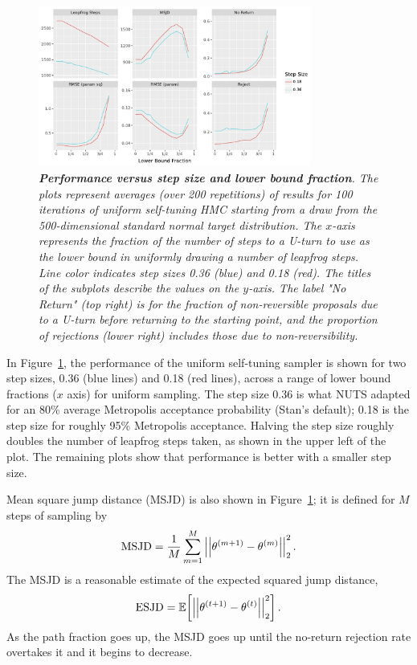 \documentclass[letterpaper,11pt]{article}
\theoremstyle{plain}%
\theoremstyle{remark}
\begin{document}
\begin{figure}[t]
\begin{center}
\includegraphics[width=0.8\textwidth]{img/results/uniform/uniform_prob_steps_plot.pdf}
\end{center}
\caption{\it {\bfseries Performance versus step size and lower bound fraction}.  The plots represent averages (over 200 repetitions) of results for 100 iterations of uniform self-tuning HMC starting from a draw from the 500-dimensional standard normal target distribution.  The $x$-axis represents the fraction of the number of steps to a U-turn to use as the lower bound in uniformly drawing a number of leapfrog steps.  Line color indicates step sizes 0.36 (blue) and 0.18 (red).  The titles of the subplots describe the values on the $y$-axis.  The label "No Return" (top right) is for the fraction of non-reversible proposals due to a U-turn before returning to the starting point, and the proportion of rejections (lower right) includes those due to non-reversibility.}\label{fig:step-lb-uniform}
\end{figure}

In Figure~\ref{fig:step-lb-uniform}, the performance of the uniform self-tuning sampler is shown for two step sizes, 0.36 (blue lines) and 0.18 (red lines), across a range of lower bound fractions ($x$ axis) for uniform sampling.  The step size 0.36 is what NUTS adapted for an 80\% average Metropolis acceptance probability (Stan's default); 0.18 is the step size for roughly 95\% Metropolis acceptance.  Halving the step size roughly doubles the number of leapfrog steps taken, as shown in the upper left of the plot.  The remaining plots show that performance is better with a smaller step size.  

Mean square jump distance (MSJD) is also shown in Figure~\ref{fig:step-lb-uniform}; it is defined for $M$ steps of sampling by
\begin{equation}
\textrm{MSJD}
= \frac{1}{M} \sum_{m = 1}^M \left|\left|\theta^{(m+1)} - \theta^{(m)}\right|\right|_2^2.
\end{equation}
The MSJD is a reasonable estimate of the expected squared jump distance, 
\begin{equation}
\textrm{ESJD}
= \mathbb{E}\!\left[\left|\left|\theta^{(t+1)} - \theta^{(t)}\right|\right|^2_2\right].
\end{equation}
As the path fraction goes up, the MSJD goes up until the no-return rejection rate overtakes it and it begins to decrease. 
\end{document}
